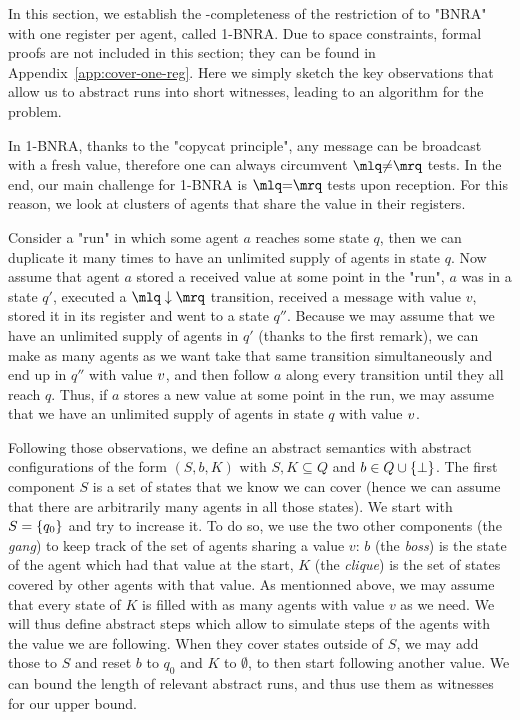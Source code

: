 In this section, we establish the \NP-completeness of the restriction of \COVER to "BNRA" with one register per agent, called 1-BNRA. Due to space constraints, formal proofs are not included in this section; they can be found in Appendix~\ref{app:cover-one-reg}. Here we simply sketch the key observations that allow us to abstract runs into short witnesses, leading to an \NP algorithm for the problem.
	
	In 1-BNRA, thanks to the "copycat principle", any  message can be broadcast with a fresh value, therefore one can always circumvent $\quotemarks{\diseqtestact}$ tests. In the end, our main challenge for 1-BNRA is $\quotemarks{\eqtestact}$ tests upon reception.
	For this reason, we look at clusters of agents that share the value in their registers. 

	Consider a "run" in which some agent $a$ reaches some state $q$, then we can duplicate it many times to have an unlimited supply of agents in state $q$.
	Now assume that agent $a$ stored a received value at some point in the "run", $a$ was in a state $q'$, executed a $\quotemarks{\enregact}$ transition, received a message with value $v$, stored it in its register and went to a state $q''$. 
	Because we may assume that we have an unlimited supply of agents in $q'$ (thanks to the first remark), we can make as many agents as we want take that same transition simultaneously and end up in $q''$ with value $v$, and then follow $a$ along every transition until they all reach $q$. 
	Thus, if $a$ stores a new value at some point in the run, we may assume that we have an unlimited supply of agents in state $q$ with value $v$. 
	
	Following those observations, we define an abstract semantics with abstract configurations of the form $(S, b, K)$ with $S, K \subseteq Q$ and $b \in Q \cup \{\bot\}$. The first component $S$ is a set of states that we know we can cover (hence we can assume that there are arbitrarily many agents in all those states).
	We start with $S = \{q_0\}$ and try to increase it. To do so, we use the two other components (the \emph{gang}) to keep track of the set of agents sharing a value $v$: $b$ (the \emph{boss}) is the state of the agent which had that value at the start, $K$ (the \emph{clique}) is the set of states covered by other agents with that value. As mentionned above, we may assume that every state of $K$ is filled with as many agents with value $v$ as we need. 
	We will thus define abstract steps which allow to simulate steps of the agents with the value we are following. When they cover states outside of $S$, we may add those to $S$ and reset $b$ to $q_0$ and $K$  to $\emptyset$, to then start following another value.
	We can bound the length of relevant abstract runs, and thus use them as witnesses for our \NP upper bound.
	
